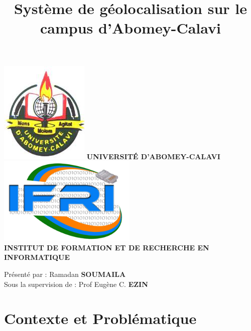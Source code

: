 \documentclass[11pt,handout]{beamer}
\author[Ramadan SOUMAILA]{}
\title{Système de géolocalisation sur le campus d'Abomey-Calavi}
\institute{}
\date{}
\begin{document}
\begin{frame}
	\begin{center}
	\includegraphics[scale=0.15]{images/logoUAC1.png}
	 \hspace{1.1cm}
	  {\scriptsize \textbf{\textsf{UNIVERSITÉ D'ABOMEY-CALAVI}}}
	   \hspace{1.1cm}
	   \includegraphics[scale=0.15]{images/logoIfri.png}\\
	  {\footnotesize \textbf {\textsf{INSTITUT DE FORMATION ET DE RECHERCHE EN INFORMATIQUE}}}
	\end{center}
	\begin{center}
		\titlepage
		Présenté par : Ramadan \textbf{SOUMAILA\\}
		Sous la supervision de : Prof Eugène C. \textbf{EZIN}
	\end{center}
\end{frame}
	\section{Contexte et Problématique}
\end{document}
